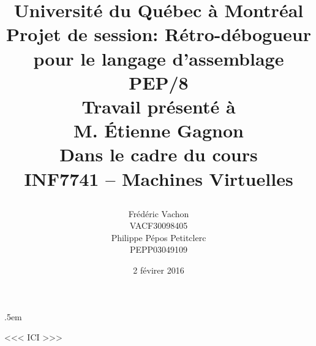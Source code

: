 \documentclass{article}
\title{ 
	\Large{Université du Québec à Montréal}\\ 
	\vspace{3cm} 
	\huge{Projet de session: Rétro-débogueur pour le langage d'assemblage PEP/8}\\ 
	\vspace{3cm} 
	\Large{Travail présenté à \\M. Étienne Gagnon} \\ 
	\vspace{1.5cm} 
	\Large{Dans le cadre du cours \\INF7741 – Machines Virtuelles} \\ 
	\vspace{1cm} 
	\author{Frédéric Vachon\\VACF30098405\\Philippe Pépos Petitclerc\\PEPP03049109} 
	\date{\vspace{0.5cm} 2 févirer 2016} 
	\vfill 
}
\begin{document}
 
\maketitle 

\thispagestyle{empty} 
\clearpage 

\openup .5em

<<< ICI >>>
\end{document}
